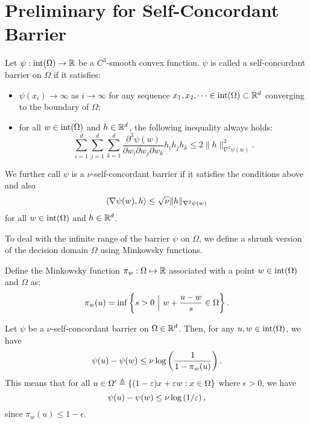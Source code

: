 \section{Preliminary for Self-Concordant Barrier}\label{app:scb}
\begin{definition}\label{def:scb}
    Let $\psi:\mathrm{int}(\Omega)\to \mathbb{R}$ be a $C^3$-smooth convex function. $\psi$ is called a self-concordant barrier on $\Omega$ if it satisfies: 
    \begin{itemize}
    \item $\psi(x_i)\to \infty$ as $i\to \infty$ for any sequence $x_1,x_2,\dots\in\mathrm{int}(\Omega)\subset \mathbb{R}^d$ converging to the boundary of $\Omega$;
    \item for all $w\in\mathrm{int}(\Omega)$ and $h\in\mathbb{R}^d$, the following inequality always holds:
    $$
    \sum^d_{i=1}\sum^d_{j=1}\sum^d_{k=1}\frac{\partial^3\psi(w)}{\partial w_i\partial w_j\partial w_k}h_ih_jh_k\le 2\|h\|_{\nabla^2\psi(w)}^3.
    $$
    
    \end{itemize}
    We further call $\psi$ is a $\nu$-self-concordant barrier if it satisfies the conditions above and also
    $$\left\langle {\nabla\psi(w),h} \right\rangle\le \sqrt{\nu}\|h\|_{\nabla^2\psi(w)}$$
    for all $w\in\mathrm{int}(\Omega)$ and $h\in\mathbb{R}^d$.
\end{definition}

To deal with the infinite range of the barrier $\psi$ on $\Omega$, we define a shrunk version of the decision domain $\Omega$ using Minkowsky functions.

\begin{definition}\label{def:minkowsky-functions}
    Define the Minkowsky function $\pi_w:\Omega\mapsto\mathbb{R}$ associated with a point $w\in\mathrm{int}(\Omega)$ and $\Omega$ as:
    \begin{equation*}
        \pi_w(u) = \inf\left\{s>0~\Big|~w+\frac{u-w}{s}\in\Omega\right\}.
    \end{equation*}
\end{definition}

\begin{lemma}\label{lem:self_concordant}
    Let $\psi$ be a $\nu$-self-concordant barrier on $\Omega\in\mathbb{R}^d$. Then, for any $u,w\in\mathrm{int}(\Omega)$, we have
    \begin{equation*}
        \psi(u)-\psi(w)\le\nu\log\left(\frac{1}{1-\pi_w(u)}\right).
    \end{equation*}
    This means that for all $u\in\Omega'\triangleq\left\{(1-\varepsilon)x+\varepsilon w:x\in\Omega\right\}$ where $\epsilon>0$, we have
    \begin{equation*}
        \psi(u)-\psi(w)\le\nu\log\left(1/\varepsilon\right),
    \end{equation*}
    since $\pi_{w}(u)\leq 1-\epsilon$.
\end{lemma}



